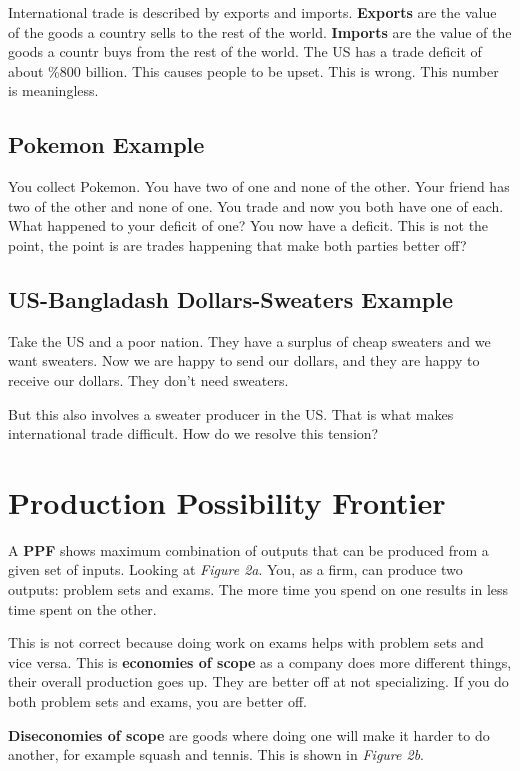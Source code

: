 \documentclass{article}
\begin{document}
\bigbreak

International trade is described by exports and imports. \textbf{Exports} are
the value of the goods a country sells to the rest of the world.
\textbf{Imports} are the value of the goods a countr buys from the rest of the
world. The US has a trade deficit of about \%800 billion. This causes people to
be upset. This is wrong. This number is meaningless.

\subsection{Pokemon Example}

You collect Pokemon. You have two of one and none of the other. Your friend has
two of the other and none of one. You trade and now you both have one of each.
What happened to your deficit of one? You now have a deficit. This is not the
point, the point is are trades happening that make both parties better off?

\subsection{US-Bangladash Dollars-Sweaters Example}

Take the US and a poor nation. They have a surplus of cheap sweaters and we want
sweaters. Now we are happy to send our dollars, and they are happy to receive
our dollars. They don't need sweaters.

But this also involves a sweater producer in the US. That is what makes
international trade difficult. How do we resolve this tension?

\section{Production Possibility Frontier}

A \textbf{PPF} shows maximum combination of outputs that can be produced from a
given set of inputs. Looking at \textit{Figure 2a}. You, as a firm, can produce
two outputs: problem sets and exams. The more time you spend on one results in
less time spent on the other. 

This is not correct because doing work on exams helps with problem sets and vice
versa. This is \textbf{economies of scope} as a company does more different
things, their overall production goes up. They are better off at not
specializing. If you do both problem sets and exams, you are better off. 

\textbf{Diseconomies of scope} are goods where doing one will make it harder to
do another, for example squash and tennis. This is shown in \textit{Figure 2b}.
\end{document}

